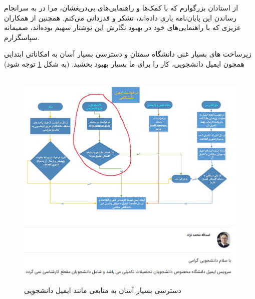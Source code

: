 


\begin{center}
\end{center}

از استادان بزرگوارم که با کمک‌ها و راهنمایی‌های بی‌دریغشان، مرا
در به سرانجام رساندن این پایان‌نامه یاری داده‌اند، تشکر و قدردانی می‌کنم.
همچنین از همکاران عزیزی که با راهنمایی‌های خود در بهبود نگارش این نوشتار
سهیم بوده‌اند، صمیمانه سپاسگزارم.

زیرساخت های بسیار غنی دانشگاه سمنان و دسترسی بسیار آسان به امکاناتی ابتدایی همچون ایمیل دانشجویی، کار را برای ما بسیار بهبود بخشید. (به شکل \ref{fig:screenshot001} توجه شود) 
\\
\\


\begin{figure}[h]
	\centering
	\includegraphics[width=1\linewidth]{screenshot002}
	\includegraphics[width=1\linewidth]{screenshot001}
	\caption{دسترسی بسیار آسان به منابعی مانند ایمیل دانشجویی}
	\label{fig:screenshot001}
\end{figure}


